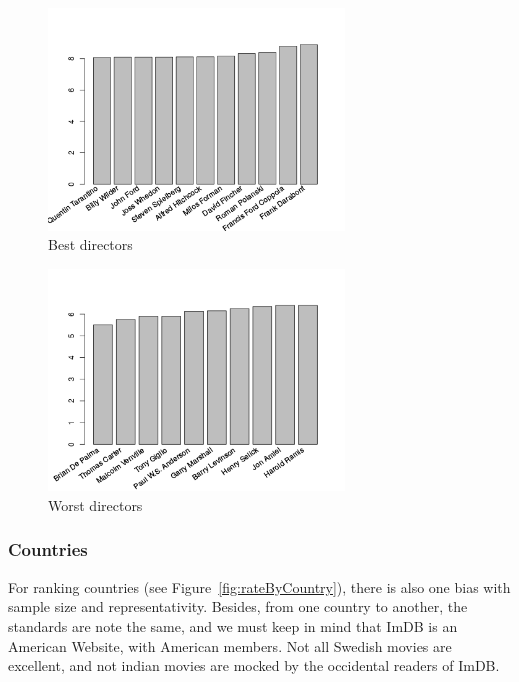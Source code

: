 \begin{figure}[!h]
\begin{center}
\includegraphics[width=0.70\textwidth]{../src/pre-processing/stats/results/bestDirectors.png}
\end{center}
\caption{Best directors}
\label{fig:bestDirectors}
\end{figure}

\begin{figure}[!h]
\begin{center}
\includegraphics[width=0.70\textwidth]{../src/pre-processing/stats/results/worstDirectors.png}
\end{center}
\caption{Worst directors}
\label{fig:worstDirectors}
\end{figure}

\newpage
\subsubsection{Countries}
\label{subs:Countries}

For ranking countries (see Figure~\ref{fig:rateByCountry}), there is also one bias with sample size and representativity.
Besides, from one country to another, the standards are note the same, and we must keep in mind that ImDB is an American Website, with American members.
Not all Swedish movies are excellent, and not indian movies are mocked by the occidental readers of ImDB.

